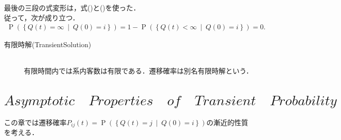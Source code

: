 \documentclass[a4j,papersize,disablejfam,slide,14pt]{jsarticle}
\def\cprob#1#2{\operatorname{P} \left(\left\{ #1 \ \middle|\ #2 \right\}\right)} %
\begin{document}
    最後の三段の式変形は，式()と()を使った．\\
    従って，次が成り立つ．
    \begin{align}
    	\cprob{Q(t) = \infty}{Q(0)=i} = 1 - \cprob{Q(t) < \infty}{Q(0)=i} = 0.
    \end{align}
    \begin{screen}
    	\begin{description}
    		\item[有限時解{\rm (Transient\quad Solution)}]\mbox{}\\
            	有限時間内では系内客数は有限である．遷移確率は別名有限時解という．
    	\end{description}
    \end{screen}

\section{$Asymptotic\quad Properties\quad of\quad Transient\quad Probability$}
	この章では遷移確率$P_{ij}(t) = \cprob{Q(t) = j}{Q(0)=i}$の漸近的性質を考える．
\end{document}
